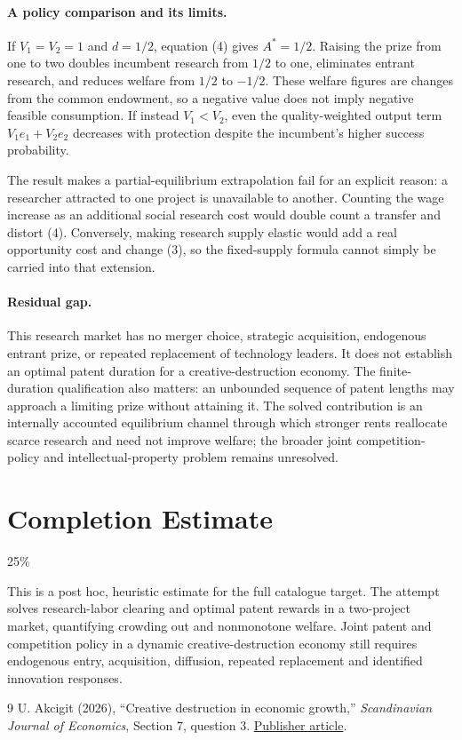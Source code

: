 \documentclass[11pt]{article}
\theoremstyle{definition}
\begin{document}
\paragraph{A policy comparison and its limits.}
If $V_1=V_2=1$ and $d=1/2$, equation (4) gives $A^*=1/2$. Raising the prize from one to two doubles incumbent research from $1/2$ to one, eliminates entrant research, and reduces welfare from $1/2$ to $-1/2$. These welfare figures are changes from the common endowment, so a negative value does not imply negative feasible consumption. If instead $V_1<V_2$, even the quality-weighted output term $V_1e_1+V_2e_2$ decreases with protection despite the incumbent's higher success probability.

The result makes a partial-equilibrium extrapolation fail for an explicit reason: a researcher attracted to one project is unavailable to another. Counting the wage increase as an additional social research cost would double count a transfer and distort (4). Conversely, making research supply elastic would add a real opportunity cost and change (3), so the fixed-supply formula cannot simply be carried into that extension.

\paragraph{Residual gap.}
This research market has no merger choice, strategic acquisition, endogenous entrant prize, or repeated replacement of technology leaders. It does not establish an optimal patent duration for a creative-destruction economy. The finite-duration qualification also matters: an unbounded sequence of patent lengths may approach a limiting prize without attaining it. The solved contribution is an internally accounted equilibrium channel through which stronger rents reallocate scarce research and need not improve welfare; the broader joint competition-policy and intellectual-property problem remains unresolved.

\section{Completion Estimate}
25\%

This is a post hoc, heuristic estimate for the full catalogue target.
The attempt solves research-labor clearing and optimal patent rewards in a two-project market, quantifying crowding out and nonmonotone welfare. Joint patent and competition policy in a dynamic creative-destruction economy still requires endogenous entry, acquisition, diffusion, repeated replacement and identified innovation responses.

\begin{thebibliography}{9}
 U. Akcigit (2026), ``Creative destruction in economic growth,'' \emph{Scandinavian Journal of Economics}, Section 7, question 3. \href{https://onlinelibrary.wiley.com/doi/10.1111/sjoe.70037}{Publisher article}.
\end{thebibliography}
\end{document}
